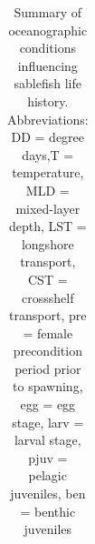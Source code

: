 \documentclass[
  english,
]{article}
\begin{document}
\begin{landscape}

\begingroup
\fontsize{8.0pt}{9.0pt}\selectfont

\begin{longtable}{>{\raggedright\arraybackslash}p{\dimexpr 75.00pt -2\tabcolsep-1.5\arrayrulewidth}>{\raggedright\arraybackslash}p{\dimexpr 56.25pt -2\tabcolsep-1.5\arrayrulewidth}>{\raggedright\arraybackslash}p{\dimexpr 56.25pt -2\tabcolsep-1.5\arrayrulewidth}>{\raggedright\arraybackslash}p{\dimexpr 90.00pt -2\tabcolsep-1.5\arrayrulewidth}>{\raggedright\arraybackslash}p{\dimexpr 187.50pt -2\tabcolsep-1.5\arrayrulewidth}>{\raggedright\arraybackslash}p{\dimexpr 56.25pt -2\tabcolsep-1.5\arrayrulewidth}>{\raggedright\arraybackslash}p{\dimexpr 52.50pt -2\tabcolsep-1.5\arrayrulewidth}}

\caption{\label{tbl-LH-appendix}Summary of oceanographic conditions
influencing sablefish life history. Abbreviations: DD = degree days,T =
temperature, MLD = mixed-layer depth, LST = longshore transport, CST =
crossshelf transport, pre = female precondition period prior to
spawning, egg = egg stage, larv = larval stage, pjuv = pelagic
juveniles, ben = benthic juveniles}

\tabularnewline


\end{longtable}
\end{landscape}
\end{document}
